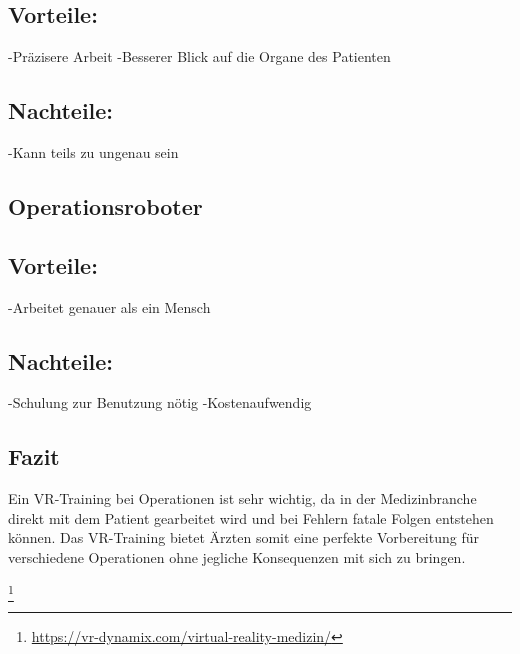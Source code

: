 \subsection{Vorteile:}
-Präzisere Arbeit
-Besserer Blick auf die Organe des Patienten
\subsection{Nachteile:}
-Kann teils zu ungenau sein
\subsection{Operationsroboter}
\subsection{Vorteile:}
-Arbeitet genauer als ein Mensch
\subsection{Nachteile:}
-Schulung zur Benutzung nötig
-Kostenaufwendig

\subsection{Fazit}
Ein VR-Training bei Operationen ist sehr wichtig, da in der Medizinbranche direkt mit dem Patient gearbeitet wird und bei Fehlern fatale Folgen entstehen können. Das VR-Training bietet Ärzten somit eine perfekte Vorbereitung für verschiedene Operationen ohne jegliche Konsequenzen mit sich zu bringen.


\footnote{\url{https://vr-dynamix.com/virtual-reality-medizin/}}

